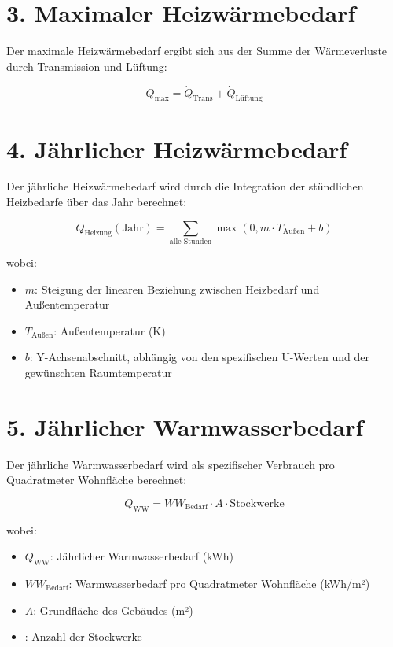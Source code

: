 \documentclass{article}
\begin{document}
\section*{3. Maximaler Heizwärmebedarf}

Der maximale Heizwärmebedarf ergibt sich aus der Summe der Wärmeverluste durch Transmission und Lüftung:

\begin{equation}
Q_\text{max} = \dot{Q}_\text{Trans} + \dot{Q}_\text{Lüftung}
\end{equation}

\section*{4. Jährlicher Heizwärmebedarf}

Der jährliche Heizwärmebedarf wird durch die Integration der stündlichen Heizbedarfe über das Jahr berechnet:

\begin{equation}
Q_\text{Heizung}(\text{Jahr}) = \sum_{\text{alle Stunden}} \max\left(0, m \cdot T_\text{Außen} + b\right)
\end{equation}

\noindent
wobei:
\begin{itemize}
    \item \(m\): Steigung der linearen Beziehung zwischen Heizbedarf und Außentemperatur
    \item \(T_\text{Außen}\): Außentemperatur (K)
    \item \(b\): Y-Achsenabschnitt, abhängig von den spezifischen U-Werten und der gewünschten Raumtemperatur
\end{itemize}

\section*{5. Jährlicher Warmwasserbedarf}

Der jährliche Warmwasserbedarf wird als spezifischer Verbrauch pro Quadratmeter Wohnfläche berechnet:

\begin{equation}
Q_\text{WW} = WW_\text{Bedarf} \cdot A \cdot \text{Stockwerke}
\end{equation}

\noindent
wobei:
\begin{itemize}
    \item \(Q_\text{WW}\): Jährlicher Warmwasserbedarf (kWh)
    \item \(WW_\text{Bedarf}\): Warmwasserbedarf pro Quadratmeter Wohnfläche (kWh/m²)
    \item \(A\): Grundfläche des Gebäudes (m²)
    \item {}: Anzahl der Stockwerke
\end{itemize}
\end{document}
